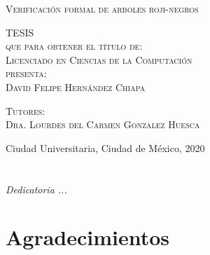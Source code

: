 \documentclass[8pt,leqno,pdflatex,spanish]{book}
\theoremstyle{plain}
\theoremstyle{definition}
\theoremstyle{remark}
\begin{document}
\begin{titlepage}
\begin{minipage}[c][0.81\textheight][t]{0.75\textwidth}
\begin{center}
{\large\scshape Verificación formal de arboles roji-negros}\\[.2in]

\vspace{2cm}

\textsc{\LARGE T\hspace{1.5cm}E\hspace{1.5cm}S\hspace{1.5cm}I\hspace{1.5cm}S}\\[0.5cm]
\textsc{\large que para obtener el t\'itulo de:}\\[0.5cm]
\textsc{\large Licenciado en Ciencias de la Computación}\\[0.5cm]
\textsc{\large presenta:}\\[0.5cm]
\textsc{\large {David Felipe Hern\'andez Chiapa}}\\[2cm]

\vspace{0.5cm}

{\large\scshape Tutores:\\[0.3cm] {Dra. Lourdes del Carmen Gonzalez Huesca}}\\[.2in]

\vspace{0.5cm}

\large{Ciudad Universitaria, Ciudad de México,}{ }{2020}
\end{center}
\end{minipage}
\end{titlepage}



\frontmatter
\chapter*{}
\begin{flushright}%
\emph{Dedicatoria ...}
\thispagestyle{empty}
\end{flushright}

\chapter{Agradecimientos}

\tableofcontents
\listoffigures


\mainmatter











\backmatter%
\end{document}
